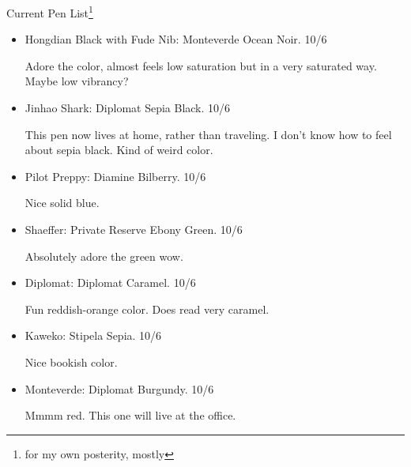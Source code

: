 \documentclass[12pt]{article}
\renewcommand{\,}{\textsuperscript{,}}
\begin{document}
Current Pen List\footnote{for my own posterity, mostly}

\begin{itemize}  
\item Hongdian Black with Fude Nib: Monteverde Ocean Noir. 10/6

Adore the color, almost feels low saturation but in a very saturated way.  
Maybe low vibrancy?  
\item Jinhao Shark: Diplomat Sepia Black. 10/6

This pen now lives at home, rather than traveling.  
I don't know how to feel about sepia black.  
Kind of weird color.  
\item Pilot Preppy: Diamine Bilberry. 10/6

Nice solid blue.  
\item Shaeffer: Private Reserve Ebony Green. 10/6

Absolutely adore the green wow.  
\item Diplomat: Diplomat Caramel. 10/6

Fun reddish-orange color.  
Does read very caramel.  
\item Kaweko: Stipela Sepia. 10/6

Nice bookish color.  
\item Monteverde: Diplomat Burgundy. 10/6

Mmmm red. This one will live at the office.

\end{itemize}
\end{document}
